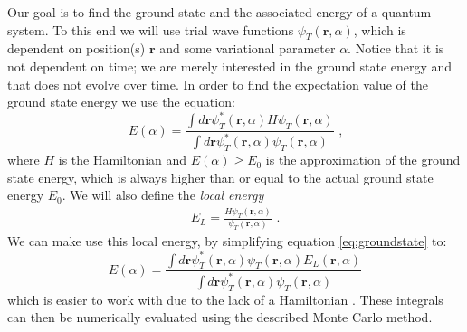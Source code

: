 Our goal is to find the ground state and the associated energy of a quantum system. To this end we will
use trial wave functions $\psi_T(\textbf{r},\alpha)$, which is dependent on position(s) $\textbf{r}$ and some variational parameter $\alpha$.
Notice that it is not dependent on time; we are merely interested in the ground state energy and that does not evolve over time.
In order to find the expectation value of the ground state energy we use the equation:
\begin{equation}
	\label{eq:groundstate}
	E(\alpha) = \frac{\int d\textbf{r} \psi_T^*(\textbf{r},\alpha)H\psi_T(\textbf{r},\alpha)}{\int d\textbf{r}
	 \psi_T^*(\textbf{r},\alpha)\psi_T(\textbf{r},\alpha)} \text{~,}
\end{equation}
where $H$ is the Hamiltonian and $E(\alpha) \geq E_0$ is the approximation of the ground state energy, which is always higher
than or equal to the actual ground state energy $E_0$.  We will also define the \textit{local energy}
\begin{align}
	\label{eq:local_energy}
	E_L = \frac{H\psi_T(\textbf{r},\alpha)}{\psi_T(\textbf{r},\alpha)} \text{~.}
\end{align}
We can make use this local energy, by simplifying equation \ref{eq:groundstate} to:
\begin{equation}
	\label{eq:groundstate2}
	E(\alpha) = \frac{\int d\textbf{r} \psi_T^*(\textbf{r},\alpha)\psi_T(\textbf{r},\alpha)E_L(\textbf{r},\alpha)}{\int d\textbf{r} \psi_T^*(\textbf{r},\alpha)\psi_T(\textbf{r},\alpha)}
\end{equation}
which is easier to work with due to the lack of a Hamiltonian \cite{JosBook}. These integrals can then be numerically evaluated using
the described Monte Carlo method.



